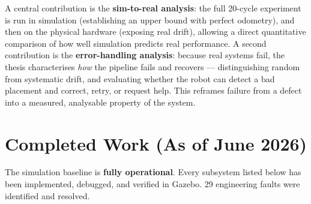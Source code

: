 \documentclass[11pt,a4paper]{article}
\begin{document}
A central contribution is the \textbf{sim-to-real analysis}: the full 20-cycle
experiment is run in simulation (establishing an upper bound with perfect odometry),
and then on the physical hardware (exposing real drift), allowing a direct quantitative
comparison of how well simulation predicts real performance. A second contribution is
the \textbf{error-handling analysis}: because real systems fail, the thesis characterises
\emph{how} the pipeline fails and recovers --- distinguishing random from systematic
drift, and evaluating whether the robot can detect a bad placement and correct, retry,
or request help. This reframes failure from a defect into a measured, analysable
property of the system.

\newpage

\section{Completed Work (As of June 2026)}

\begin{tcolorbox}[colback=boxbg, colframe=green, arc=3pt, boxrule=1pt,
    left=1em, right=1em, top=0.8em, bottom=0.8em]
    The simulation baseline is \textbf{fully operational}. Every subsystem listed below
    has been implemented, debugged, and verified in Gazebo. 29 engineering faults were
    identified and resolved.
\end{tcolorbox}
\end{document}
